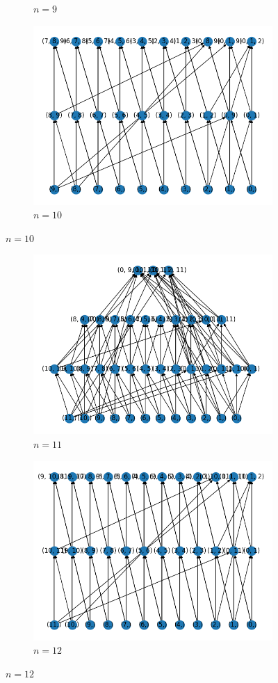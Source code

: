 \begin{figure}[h]
\begin{subfigure}{.5\textwidth}
        \caption{$ n = 9 $}
      \end{subfigure}%
      \begin{subfigure}{.5\textwidth}
        \centering
        \includegraphics[width=.8\linewidth]{10.png}
        \caption{$ n = 10 $}
      \end{subfigure}
\end{figure}
\begin{figure}[h]
     \begin{subfigure}{.5\textwidth}
        \centering
        \includegraphics[width=.8\linewidth]{11.png}
        \caption{$ n = 11 $}
      \end{subfigure}%
      \begin{subfigure}{.5\textwidth}
        \centering
        \includegraphics[width=.8\linewidth]{12.png}
        \caption{$ n = 12 $}
      \end{subfigure}
\end{figure}
